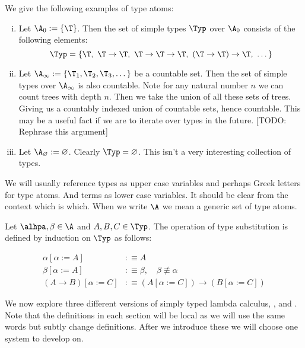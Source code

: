 \begin{example}
    We give the following examples of type atoms:
    \begin{enumerate}[(i)]
        \item Let $\A_0:=\{\T\}$. Then the set of simple types $\Typ$ over $\A_0$  consists of the following elements: 
        $$\Typ = \{ \T,\ \T \to \T,\ \T \to \T \to \T,\ (\T \to \T) \to \T,\ \dots \}$$
        
        \item Let $\A_\infty:=\{\T_1, \T_2, \T_3, \dots\}$ be a countable set. Then the set of simple types over $\A_\infty$ is also countable. Note for any natural number $n$ we can count trees with depth $n$. Then we take the union of all these sets of trees. Giving us a countably indexed union of countable sets, hence countable. This may be a useful fact if we are to iterate over types in the future. [TODO: Rephrase this argument]
        
        \item Let $\A_\varnothing:= \varnothing$. Clearly $\Typ = \varnothing$. This isn't a very interesting collection of types.
    \end{enumerate}
\end{example}

\begin{remark}
    We will usually reference types as upper case variables and perhaps Greek letters for type atoms. And terms as lower case variables. It should be clear from the context which is which. When we write $\A$ we mean a generic set of type atoms.
\end{remark}

\begin{defin}
Let $\alhpa,\beta \in \A$ and $A,B,C \in \Typ$. The operation of type substitution is defined by induction on $\Typ$ as follows:

\[\begin{aligned}
    \alpha[\alpha:=A] &:\equiv A \\
    \beta[\alpha:=A] &:\equiv \beta,\quad \beta\not\equiv \alpha \\
    (A \to B)[\alpha:=C] &:\equiv (A[\alpha:=C]) \to (B[\alpha:=C])
\end{aligned}\]


\end{defin}

We now explore three different versions of simply typed lambda calculus, \stcu, \stch and \stdb. Note that the definitions in each section will be local as we will use the same words but subtly change definitions. After we introduce these we will choose one system to develop on.


